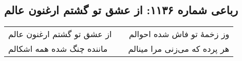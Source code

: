 \begin{center}
\section*{رباعی شماره ۱۱۳۶: از عشق تو گشتم ارغنون عالم}
\label{sec:1136}
\begin{longtable}{l p{0.5cm} r}
از عشق تو گشتم ارغنون عالم
&&
وز زخمهٔ تو فاش شده احوالم
\\
ماننده چنگ شده همه اشکالم
&&
هر پرده که می‌زنی مرا مینالم
\\
\end{longtable}
\end{center}

